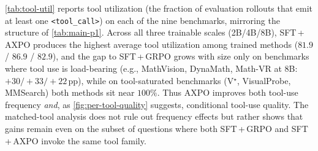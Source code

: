\documentclass{llmxive}
\providecommand{\toolcall}{\texttt{<tool\_call>}\xspace}
\providecommand{\toolUtilAxpoAvg}{$81.9$ / $86.9$ / $82.9$}
\providecommand{\toolUtilHardReasoning}{MathVision, DynaMath, Math-VR}
\providecommand{\toolUtilHardReasoningGap}{$+30/+33/+22$}
\begin{document}
\autoref{tab:tool-util} reports tool utilization (the fraction of evaluation rollouts that emit at least one \toolcall) on each of the nine benchmarks, mirroring the structure of \autoref{tab:main-p1}. Across all three trainable scales (2B/4B/8B), SFT\,+\,AXPO produces the highest average tool utilization among trained methods (\toolUtilAxpoAvg), and the gap to SFT\,+\,GRPO grows with size only on benchmarks where tool use is load-bearing (e.g., \toolUtilHardReasoning{} at 8B: \toolUtilHardReasoningGap\,pp), while on tool-saturated benchmarks (V$^{\star}$, VisualProbe, MMSearch) both methods sit near $100\%$. Thus AXPO improves both tool-use frequency \emph{and}, as \autoref{fig:per-tool-quality} suggests, conditional tool-use quality. The matched-tool analysis does not rule out frequency effects but rather shows that gains remain even on the subset of questions where both SFT\,+\,GRPO and SFT\,+\,AXPO invoke the same tool family.
\end{document}

